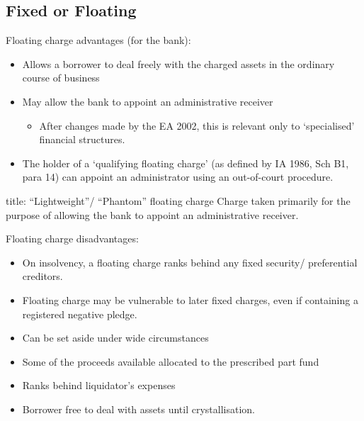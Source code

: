 \documentclass[
]{article}
\newenvironment{Shaded}{}{}
\newcommand{\NormalTok}[1]{#1}
\providecommand{\tightlist}{%
  \setlength{\itemsep}{0pt}\setlength{\parskip}{0pt}}
\begin{document}
\hypertarget{fixed-or-floating}{%
\subsection{Fixed or Floating}\label{fixed-or-floating}}

Floating charge advantages (for the bank):

\begin{itemize}
\tightlist
\item
  Allows a borrower to deal freely with the charged assets in the
  ordinary course of business
\item
  May allow the bank to appoint an administrative receiver

  \begin{itemize}
  \tightlist
  \item
    After changes made by the EA 2002, this is relevant only to
    `specialised' financial structures.
  \end{itemize}
\item
  The holder of a `qualifying floating charge' (as defined by IA 1986,
  Sch B1, para 14) can appoint an administrator using an out-of-court
  procedure.
\end{itemize}

\begin{Shaded}
\begin{Highlighting}[]
\NormalTok{title: “Lightweight”/ “Phantom” floating charge}
\NormalTok{Charge taken primarily for the purpose of allowing the bank to appoint an administrative receiver.}
\end{Highlighting}
\end{Shaded}

Floating charge disadvantages:

\begin{itemize}
\tightlist
\item
  On insolvency, a floating charge ranks behind any fixed security/
  preferential creditors.
\item
  Floating charge may be vulnerable to later fixed charges, even if
  containing a registered negative pledge.
\item
  Can be set aside under wide circumstances
\item
  Some of the proceeds available allocated to the prescribed part fund
\item
  Ranks behind liquidator's expenses
\item
  Borrower free to deal with assets until crystallisation.
\end{itemize}
\end{document}
